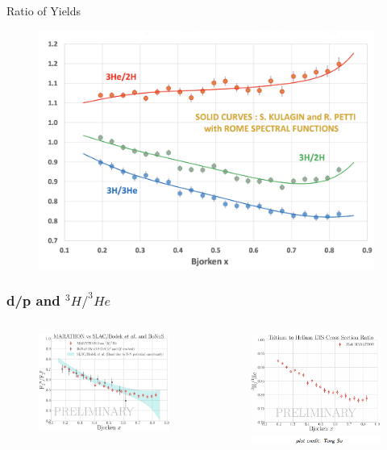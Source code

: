 \documentclass{beamer}
\begin{document}
\begin{frame}{Ratio of Yields}
\vspace{-20pt}
\begin{figure}
	\includegraphics[width=11cm]{../images/MARA_rations.pdf}
\end{figure}
\end{frame}


\iffalse

\begin{frame}{}
\frametitle{d/p and $^3H/^3He$}
\vspace{-10pt}
\begin{columns}
	\begin{figure}
		\includegraphics[width=6cm]{../images/MARA_F2.pdf}
	\end{figure}
	\begin{figure}
		\includegraphics[width=6cm]{../images/H_H.png}
	\end{figure}
\end{columns}
\end{frame}
\end{document}
